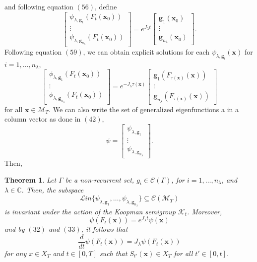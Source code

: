 \documentclass[]{article}
\newtheorem{theorem}{Theorem}
\begin{document}
and following equation $(56)$, define 
\begin{equation}
	\begin{bmatrix}
		\psi_{\lambda,\textbf{g}_1}(F_t(\textbf{x}_0)) \\
		\vdots \\
		\psi_{\lambda,\textbf{g}_{n_{\lambda}}}(F_t(\textbf{x}_0))
	\end{bmatrix} = e^{J_{\lambda}t}
	\begin{bmatrix}
		\textbf{g}_1(\textbf{x}_0) \\
		\vdots \\
		\textbf{g}_{n_{\lambda}}(\textbf{x}_0)
	\end{bmatrix}.
\end{equation}
Following equation $(59)$, we can obtain explicit solutions for each $\psi_{\lambda,\textbf{g}_i}(\textbf{x})$ for $i=1,\dots,n_{\lambda}$,
\begin{equation}
	\begin{bmatrix}
		\phi_{\lambda, \textbf{g}_1}(F_t(\textbf{x}_0)) \\
		\vdots \\
		\phi_{\lambda, \textbf{g}_{n_{\lambda}}}(F_t(\textbf{x}_0))
	\end{bmatrix} = e^{-J_{\lambda} \tau(\textbf{x})}
	\begin{bmatrix}
		\textbf{g}_1(F_{\tau(\textbf{x})}(\textbf{x})) \\
		\vdots \\
		\textbf{g}_{n_{\lambda}}(F_{\tau(\textbf{x})}(\textbf{x}))
	\end{bmatrix}
\end{equation}
for all $\textbf{x} \in \mathcal{M}_T$. We can also write the set of generalized eigenfunctions a in a column vector as done in $(42)$,
\begin{equation}
	    \psi = \begin{bmatrix}
		\psi_{\lambda, \textbf{g}_1} \\
		\vdots \\
		\psi_{\lambda, \textbf{g}_{n_{\lambda}}}
	\end{bmatrix}.
\end{equation}
Then,
\begin{theorem}
Let $\Gamma$ be a non-recurrent set, $g_i \in \mathcal{C}(\Gamma)$, for $i=1,\dots,n_{\lambda}$, and $\lambda \in \mathbb{C}$. Then, the subspace 
\begin{equation}
	\mathcal{L}in\{\psi_{\lambda, \textbf{g}_1}, \dots, \psi_{\lambda, \textbf{g}_{n_{\lambda}}}\} \subseteq \mathcal{C}(\mathcal{M}_T)
\end{equation}
is invariant under the action of the Koopman semigroup $\mathcal{K}_t$. Moreover,
\begin{equation}
	\psi(F_t(\textbf{x})) = e^{J_{\lambda}t}\psi(\textbf{x})
\end{equation}
and by $(32)$ and $(33)$, it follows that
\begin{equation}
	\frac{d}{dt}\psi(F_t(\textbf{x})) = J_{\lambda}\psi(F_t(\textbf{x}))
\end{equation}
for any $x \in X_T$ and $t \in [0,T]$ such that $S_{t'}(\textbf{x}) \in X_T$ for all $t' \in [0,t]$.
\end{theorem}
\end{document}
